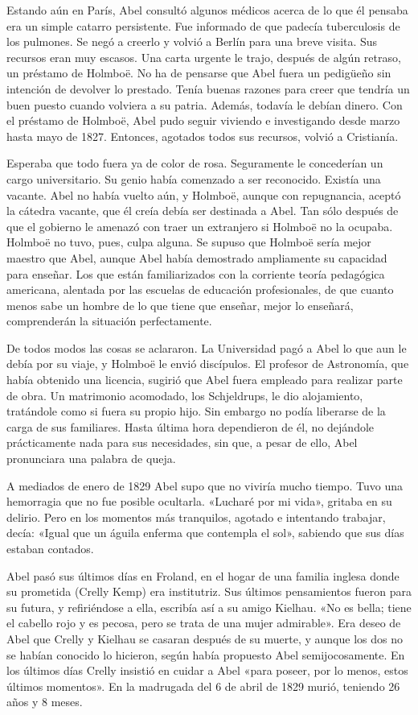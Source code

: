 \documentclass[a4paper, 12pt, draft]{article}
\begin{document}
Estando aún en París, Abel consultó algunos médicos acerca de lo que él pensaba era un simple catarro persistente. Fue informado de que padecía tuberculosis de los pulmones. Se negó a creerlo y volvió a Berlín para una breve visita. Sus recursos eran muy escasos. Una carta urgente le trajo, después de algún retraso, un préstamo de Holmboë. No ha de pensarse que Abel fuera un pedigüeño sin intención de devolver lo prestado. Tenía buenas razones para creer que tendría un buen puesto cuando volviera a su patria. Además, todavía le debían dinero. Con el préstamo de Holmboë, Abel pudo seguir viviendo e investigando desde marzo hasta mayo de 1827. Entonces, agotados todos sus recursos, volvió a Cristianía.

Esperaba que todo fuera ya de color de rosa. Seguramente le concederían un cargo universitario. Su genio había comenzado a ser reconocido. Existía una vacante. Abel no había vuelto aún, y Holmboë, aunque con repugnancia, aceptó la cátedra vacante, que él creía debía ser destinada a Abel. Tan sólo después de que el gobierno le amenazó con traer un extranjero si Holmboë no la ocupaba. Holmboë no tuvo, pues, culpa alguna. Se supuso que Holmboë sería mejor maestro que Abel, aunque Abel había demostrado ampliamente su capacidad para enseñar. Los que están familiarizados con la corriente teoría pedagógica americana, alentada por las escuelas de educación profesionales, de que cuanto menos sabe un hombre de lo que tiene que enseñar, mejor lo enseñará, comprenderán la situación perfectamente.

De todos modos las cosas se aclararon. La Universidad pagó a Abel lo que aun le debía por su viaje, y Holmboë le envió discípulos. El profesor de Astronomía, que había obtenido una licencia, sugirió que Abel fuera empleado para realizar parte de obra. Un matrimonio acomodado, los Schjeldrups, le dio alojamiento, tratándole como si fuera su propio hijo. Sin embargo no podía liberarse de la carga de sus familiares. Hasta última hora dependieron de él, no dejándole prácticamente nada para sus necesidades, sin que, a pesar de ello, Abel pronunciara una palabra de queja.

A mediados de enero de 1829 Abel supo que no viviría mucho tiempo. Tuvo una hemorragia que no fue posible ocultarla. «Lucharé por mi vida», gritaba en su delirio. Pero en los momentos más tranquilos, agotado e intentando trabajar, decía: «Igual que un águila enferma que contempla el sol», sabiendo que sus días estaban contados.

Abel pasó sus últimos días en Froland, en el hogar de una familia inglesa donde su prometida (Crelly Kemp) era institutriz. Sus últimos pensamientos fueron para su futura, y refiriéndose a ella, escribía así a su amigo Kielhau. «No es bella; tiene el cabello rojo y es pecosa, pero se trata de una mujer admirable». Era deseo de Abel que Crelly y Kielhau se casaran después de su muerte, y aunque los dos no se habían conocido lo hicieron, según había propuesto Abel semijocosamente. En los últimos días Crelly insistió en cuidar a Abel «para poseer, por lo menos, estos últimos momentos». En la madrugada del 6 de abril de 1829 murió, teniendo 26 años y 8 meses.
\end{document}

